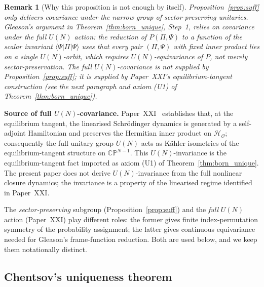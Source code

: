 \documentclass[12pt]{article}
\newtheorem{remark}[theorem]{Remark}
\newcommand{\Ocal}{\mathcal{O}}
\newcommand{\Hcal}{\mathcal{H}}
\begin{document}
\begin{remark}[Why this proposition is not enough by itself]\label{rem:suff_scope}
Proposition~\ref{prop:suff} only delivers covariance under the narrow group of sector-preserving unitaries. Gleason's argument in Theorem~\ref{thm:born_unique}, Step~1, relies on covariance under the \emph{full} $U(N)$ action: the reduction of $P(\Pi, \Psi)$ to a function of the scalar invariant $\langle\Psi|\Pi|\Psi\rangle$ uses that every pair $(\Pi, \Psi)$ with fixed inner product lies on a single $U(N)$-orbit, which requires $U(N)$-equivariance of $P$, not merely sector-preservation. The full $U(N)$-covariance is \emph{not} supplied by Proposition~\ref{prop:suff}; it is supplied by Paper~XXI's equilibrium-tangent construction (see the next paragraph and axiom (U1) of Theorem~\ref{thm:born_unique}).
\end{remark}

\textbf{Source of full $U(N)$-covariance.} Paper~XXI~\citep{SmartXXI} establishes that, at the equilibrium tangent, the linearised Schr\"odinger dynamics is generated by a self-adjoint Hamiltonian and preserves the Hermitian inner product on $\Hcal_\Ocal$; consequently the full unitary group $U(N)$ acts as K\"ahler isometries of the equilibrium-tangent structure on $\mathbb{CP}^{N-1}$. This $U(N)$-invariance is the equilibrium-tangent fact imported as axiom (U1) of Theorem~\ref{thm:born_unique}. The present paper does not derive $U(N)$-invariance from the full nonlinear closure dynamics; the invariance is a property of the linearised regime identified in Paper~XXI.

The \emph{sector-preserving} subgroup (Proposition~\ref{prop:suff}) and the \emph{full} $U(N)$ action (Paper~XXI) play different roles: the former gives finite index-permutation symmetry of the probability assignment; the latter gives continuous equivariance needed for Gleason's frame-function reduction. Both are used below, and we keep them notationally distinct.

\subsection{Chentsov's uniqueness theorem}\label{subsec:chentsov_theorem}
\end{document}
